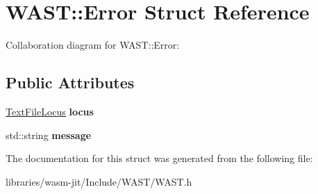 \hypertarget{struct_w_a_s_t_1_1_error}{}\section{W\+A\+ST\+:\+:Error Struct Reference}
\label{struct_w_a_s_t_1_1_error}


Collaboration diagram for W\+A\+ST\+:\+:Error\+:
\subsection*{Public Attributes}
\begin{DoxyCompactItemize}
\item 
\mbox{\label{struct_w_a_s_t_1_1_error_a5ee3e34f79cd606064560b41b32074d0}} 
\mbox{\hyperlink{struct_w_a_s_t_1_1_text_file_locus}{Text\+File\+Locus}} {\bfseries locus}
\item 
\mbox{\label{struct_w_a_s_t_1_1_error_a87fe9285176533d2c3b04d777cf17d3f}} 
std\+::string {\bfseries message}
\end{DoxyCompactItemize}


The documentation for this struct was generated from the following file\+:\begin{DoxyCompactItemize}
\item 
libraries/wasm-\/jit/\+Include/\+W\+A\+S\+T/W\+A\+S\+T.\+h\end{DoxyCompactItemize}
